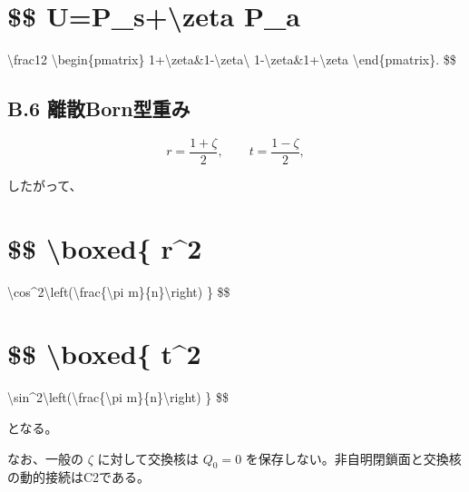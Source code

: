 \documentclass[
  a4paper,
  10pt]{article}
\begin{document}
\section{\$\$ U=P\_s+\textbackslash zeta P\_a}\label{-up_szeta-p_a}

\textbackslash frac12 \textbackslash begin\{pmatrix\}
1+\textbackslash zeta\&1-\textbackslash zeta\textbackslash{}
1-\textbackslash zeta\&1+\textbackslash zeta
\textbackslash end\{pmatrix\}. \$\$

\subsection{B.6
離散Born型重み}\label{b6-ux96e2ux6563bornux578bux91cdux307f}

\[
r=\frac{1+\zeta}{2},
\qquad
t=\frac{1-\zeta}{2},
\]

したがって、

\section{\$\$ \textbackslash boxed\{
\textbar r\textbar\^{}2}\label{-boxed-r2-1}

\textbackslash cos\^{}2\textbackslash left(\textbackslash frac\{\textbackslash pi
m\}\{n\}\textbackslash right) \} \$\$

\section{\$\$ \textbackslash boxed\{
\textbar t\textbar\^{}2}\label{-boxed-t2-1}

\textbackslash sin\^{}2\textbackslash left(\textbackslash frac\{\textbackslash pi
m\}\{n\}\textbackslash right) \} \$\$

となる。

なお、一般の \(\zeta\) に対して交換核は \(Q_0=0\)
を保存しない。非自明閉鎖面と交換核の動的接続はC2である。
\end{document}
